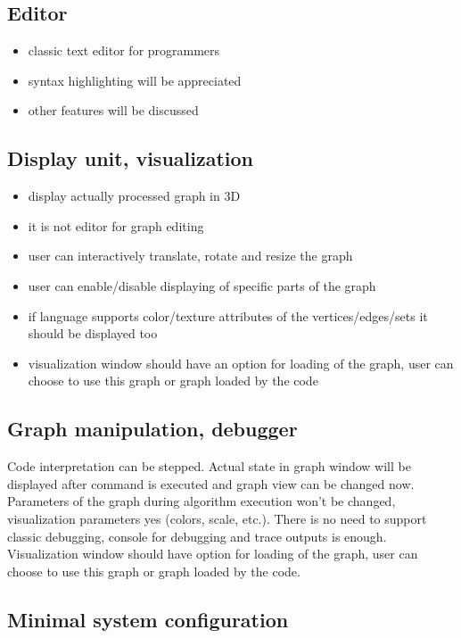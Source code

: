 \documentclass[11pt,twoside,a4paper]{book}
\begin{document}
\subsection{Editor}

\begin{itemize}
\item classic text editor for programmers
\item syntax highlighting will be appreciated
\item other features will be discussed
\end{itemize}


\subsection{Display unit, visualization}

\begin{itemize}
\item display actually processed graph in 3D
\item it is not editor for graph editing
\item user can interactively translate, rotate and resize the graph
\item user can enable/disable displaying of specific parts of the graph
\item if language supports color/texture attributes of the vertices/edges/sets it should be displayed too
\item visualization window should have an option for loading of the graph, user can choose to use this graph or graph loaded by the code
\end{itemize}


\subsection{Graph manipulation, debugger}

Code interpretation can be stepped. Actual state in graph window will be displayed after command is executed and graph view can be changed now. Parameters of the graph during algorithm execution won't be changed, visualization parameters yes (colors, scale, etc.). There is no need to support classic debugging, console for debugging and trace outputs is enough. Visualization window should have option for loading of the graph, user can choose to use this graph or graph loaded by the code.


\subsection{Minimal system configuration}
\end{document}
